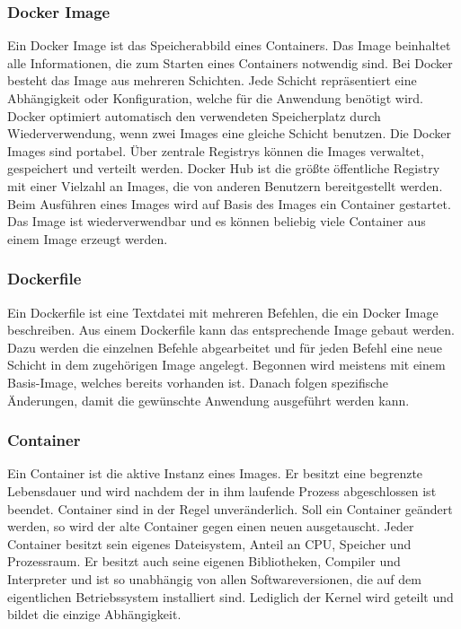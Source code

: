 \subsubsection{Docker Image}

Ein Docker Image ist das Speicherabbild eines Containers. Das Image beinhaltet alle Informationen, die zum Starten eines Containers notwendig sind. Bei Docker besteht das Image aus mehreren Schichten. Jede Schicht repräsentiert eine Abhängigkeit oder Konfiguration, welche für die Anwendung benötigt wird. Docker optimiert automatisch den verwendeten Speicherplatz durch Wiederverwendung, wenn zwei Images eine gleiche Schicht benutzen. Die Docker Images sind portabel. Über zentrale Registrys können die Images verwaltet, gespeichert und verteilt werden. Docker Hub ist die größte öffentliche Registry mit einer Vielzahl an Images, die von anderen Benutzern bereitgestellt werden. Beim Ausführen eines Images wird auf Basis des Images ein Container gestartet. Das Image ist wiederverwendbar und es können beliebig viele Container aus einem Image erzeugt werden. 

\subsubsection{Dockerfile}

Ein Dockerfile ist eine Textdatei mit mehreren Befehlen, die ein Docker Image beschreiben. Aus einem Dockerfile kann das entsprechende Image gebaut werden. Dazu werden die einzelnen Befehle abgearbeitet und für jeden Befehl eine neue Schicht in dem zugehörigen Image angelegt. Begonnen wird meistens mit einem Basis-Image, welches bereits vorhanden ist. Danach folgen spezifische Änderungen, damit die gewünschte Anwendung ausgeführt werden kann.

\subsubsection{Container}
Ein Container ist die aktive Instanz eines Images. Er besitzt eine begrenzte Lebensdauer und wird nachdem der in ihm laufende Prozess abgeschlossen ist beendet. Container sind in der Regel unveränderlich. Soll ein Container geändert werden, so wird der alte Container gegen einen neuen ausgetauscht. Jeder Container besitzt sein eigenes Dateisystem, Anteil an CPU, Speicher und Prozessraum. Er besitzt auch seine eigenen Bibliotheken, Compiler und Interpreter und ist so unabhängig von allen Softwareversionen, die auf dem eigentlichen Betriebssystem installiert sind. Lediglich der Kernel wird geteilt und bildet die einzige Abhängigkeit. 

